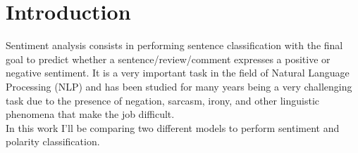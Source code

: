 \section{Introduction}
\label{sec:intro}
Sentiment analysis consists in performing sentence classification with the final goal to predict whether a sentence/review/comment expresses a positive or negative sentiment.
It is a very important task in the field of Natural Language Processing (NLP) and has been studied for many years being a very challenging task due to the 
presence of negation, sarcasm, irony, and other linguistic phenomena that make the job difficult.\\ 
In this work I'll be comparing two different models to perform sentiment and polarity classification. 
